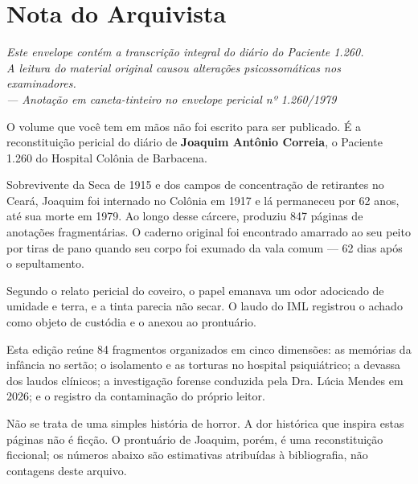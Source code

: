 \cleardoublepage
\thispagestyle{empty}
\chapter*{Nota do Arquivista}

\begin{center}
\itshape\small
Este envelope contém a transcrição integral do diário do Paciente 1.260.\\
A leitura do material original causou alterações psicossomáticas nos examinadores.\\[0.5em]
\upshape\scriptsize --- Anotação em caneta-tinteiro no envelope pericial nº 1.260/1979
\end{center}

\vspace{1.2em}

\begingroup

O volume que você tem em mãos não foi escrito para ser publicado. É a reconstituição pericial do diário de \textbf{Joaquim Antônio Correia}, o Paciente 1.260 do Hospital Colônia de Barbacena.

Sobrevivente da Seca de 1915 e dos campos de concentração de retirantes no Ceará, Joaquim foi internado no Colônia em 1917 e lá permaneceu por 62 anos, até sua morte em 1979. Ao longo desse cárcere, produziu 847 páginas de anotações fragmentárias. O caderno original foi encontrado amarrado ao seu peito por tiras de pano quando seu corpo foi exumado da vala comum --- 62 dias após o sepultamento.

\vspace{0.4em}
\noindent Segundo o relato pericial do coveiro, o papel emanava um odor adocicado de umidade e terra, e a tinta parecia não secar. O laudo do IML registrou o achado como objeto de custódia e o anexou ao prontuário.

\vspace{0.6em}
Esta edição reúne 84 fragmentos organizados em cinco dimensões: as memórias da infância no sertão; o isolamento e as torturas no hospital psiquiátrico; a devassa dos laudos clínicos; a investigação forense conduzida pela Dra. Lúcia Mendes em 2026; e o registro da contaminação do próprio leitor.

\vspace{0.6em}
Não se trata de uma simples história de horror. A dor histórica que inspira estas páginas não é ficção. O prontuário de Joaquim, porém, é uma reconstituição ficcional; os números abaixo são estimativas atribuídas à bibliografia, não contagens deste arquivo.

